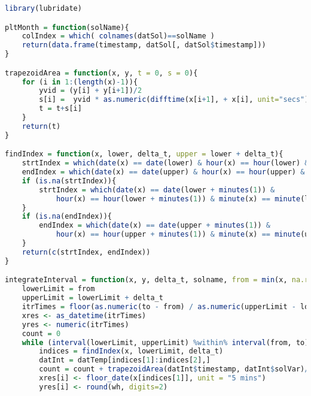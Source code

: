 

\begin{lstlisting}[language=R]
library(lubridate)

pltMonth = function(solName){
    colIndex = which( colnames(datSol)==solName )
    return(data.frame(timestamp, datSol[, datSol$timestamp]))
}

trapezoidArea = function(x, y, t = 0, s = 0){ 
    for (i in 1:(length(x)-1)){
        yvid = (y[i] + y[i+1])/2
        s[i] =  yvid * as.numeric(difftime(x[i+1], + x[i], unit="secs"))
        t = t+s[i]
    }
    return(t)
}

findIndex = function(x, lower, delta_t, upper = lower + delta_t){
    strtIndex = which(date(x) == date(lower) & hour(x) == hour(lower) & minute(x) == minute(lower))[1]
    endIndex = which(date(x) == date(upper) & hour(x) == hour(upper) & minute(x) == minute(upper))[1]
    if (is.na(strtIndex)){
        strtIndex = which(date(x) == date(lower + minutes(1)) &
            hour(x) == hour(lower + minutes(1)) & minute(x) == minute(lower + minutes(1)))[1]
    }
    if (is.na(endIndex)){
        endIndex = which(date(x) == date(upper + minutes(1)) &
            hour(x) == hour(upper + minutes(1)) & minute(x) == minute(upper + minutes(1)))[1]
    }
    return(c(strtIndex, endIndex))
}

integrateInterval = function(x, y, delta_t, solname, from = min(x, na.rm=TRUE), to = max(x, na.rm=TRUE)){
    lowerLimit = from
    upperLimit = lowerLimit + delta_t    
    itrTimes = floor(as.numeric(to - from) / as.numeric(upperLimit - lowerLimit))
    xres <- as_datetime(itrTimes)
    yres <- numeric(itrTimes)
    count = 0
    while (interval(lowerLimit, upperLimit) %within% interval(from, to)) {
        indices = findIndex(x, lowerLimit, delta_t)
        datInt = datTemp[indices[1]:indices[2],]
        count = count + trapezoidArea(datInt$timestamp, datInt$solVar)/3600
        xres[i] <- floor_date(x[indices[1]], unit = "5 mins")
        yres[i] <- round(wh, digits=2)


\end{lstlisting}
